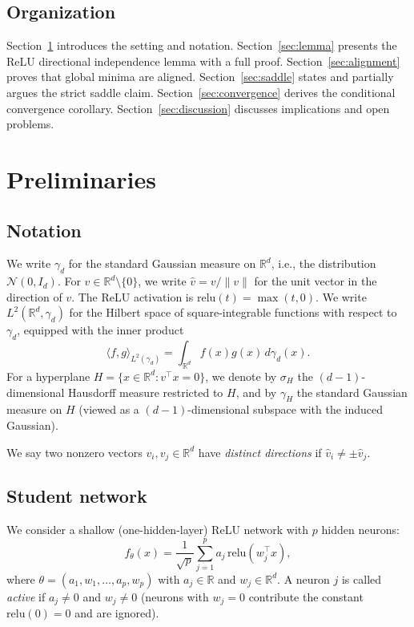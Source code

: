 \documentclass[11pt]{amsart}
\theoremstyle{definition}
\newcommand{\R}{\mathbb{R}}
\newcommand{\inner}[2]{\langle #1, #2 \rangle}
\newcommand{\norm}[1]{\| #1 \|}
\newcommand{\relu}{\mathrm{relu}}
\begin{document}
\subsection{Organization}

Section~\ref{sec:prelim} introduces the setting and notation. Section~\ref{sec:lemma} presents the ReLU directional independence lemma with a full proof. Section~\ref{sec:alignment} proves that global minima are aligned. Section~\ref{sec:saddle} states and partially argues the strict saddle claim. Section~\ref{sec:convergence} derives the conditional convergence corollary. Section~\ref{sec:discussion} discusses implications and open problems.

\section{Preliminaries}\label{sec:prelim}

\subsection{Notation}

We write $\gamma_d$ for the standard Gaussian measure on $\R^d$, i.e., the distribution $\mathcal{N}(0, I_d)$. For $v \in \R^d \setminus \{0\}$, we write $\hat{v} = v / \norm{v}$ for the unit vector in the direction of $v$. The ReLU activation is $\relu(t) = \max(t, 0)$. We write $L^2(\R^d, \gamma_d)$ for the Hilbert space of square-integrable functions with respect to $\gamma_d$, equipped with the inner product
\[
\inner{f}{g}_{L^2(\gamma_d)} = \int_{\R^d} f(x) g(x) \, d\gamma_d(x).
\]
For a hyperplane $H = \{x \in \R^d : v^\top x = 0\}$, we denote by $\sigma_H$ the $(d{-}1)$-dimensional Hausdorff measure restricted to $H$, and by $\gamma_H$ the standard Gaussian measure on $H$ (viewed as a $(d{-}1)$-dimensional subspace with the induced Gaussian).

We say two nonzero vectors $v_i, v_j \in \R^d$ have \emph{distinct directions} if $\hat{v}_i \neq \pm \hat{v}_j$.

\subsection{Student network}

We consider a shallow (one-hidden-layer) ReLU network with $p$ hidden neurons:
\begin{equation}\label{eq:student}
f_\theta(x) = \frac{1}{\sqrt{p}} \sum_{j=1}^{p} a_j \, \relu(w_j^\top x),
\end{equation}
where $\theta = (a_1, w_1, \ldots, a_p, w_p)$ with $a_j \in \R$ and $w_j \in \R^d$. A neuron $j$ is called \emph{active} if $a_j \neq 0$ and $w_j \neq 0$ (neurons with $w_j = 0$ contribute the constant $\relu(0) = 0$ and are ignored).
\end{document}
